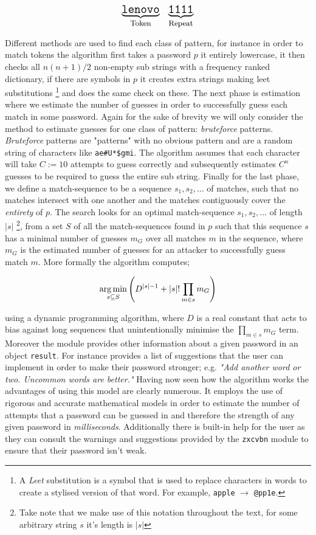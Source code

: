 \[
  \Large
  \underbrace{ \mathtt{lenovo} }_\text{\small Token}
  \; \; \;
  \underbrace{ \mathtt{1111} }_\text{\small Repeat}
\]

Different methods are used to find each class of pattern, for
instance in order to match tokens the algorithm first takes
a password $p$ it entirely lowercase, it then checks all
$n(n+1)/2$ non-empty sub strings with a frequency ranked
dictionary, if there are symbols in $p$ it creates extra
strings making leet substitutions \footnote{A \textit{Leet}
substitution is a symbol that is used to replace characters in words
to create a stylised version of that word. For example,
\texttt{apple} $\rightarrow$ \texttt{@pp1e}.}
and does the same check on these. The next phase is
estimation where we estimate the number of guesses in order
to successfully guess each match in some password. Again
for the sake of brevity we will only consider the method to
estimate guesses for one class of pattern: \textit{bruteforce}
patterns. \textit{Bruteforce} patterns are "patterns" with no
obvious pattern and are a random string of characters like
\texttt{ae\#U*\$gmi}. The algorithm assumes that each
character will take $C := 10$ attempts to guess correctly and
subsequently estimates $C^n$ guesses to be required to guess
the entire sub string. Finally for the last phase, we define a
match-sequence to be a sequence $s_1, s_2, ...$ of matches,
such that no matches intersect with one another and the
matches contiguously cover the \textit{entirety} of $p$.
The search looks
for an optimal match-sequence $s_1, s_2, ...$ of length
$\left|s\right|$ \footnote{Take note that we make use of
this notation throughout the text, for some arbitrary string $s$
it's length is $\left|s\right|$}, from a set $S$ of all the match-sequences
found in $p$ such that this sequence $s$ has a minimal number
of guesses $m_G$ over all matches $m$ in the sequence, where
$m_G$ is the estimated number of guesses for an attacker to
successfully guess match $m$. More formally the algorithm
computes;

\[
  \operatorname*{arg\,min}_{s \subseteq S} \left( D^{\left|s\right| -1} +
  \left|s\right|! \prod_{m \in s} m_G \right)
\]

using a dynamic programming algorithm,
where $D$ is a real constant that acts to bias against long
sequences that unintentionally minimise the
$\prod_{m \in s} m_G$ term. Moreover the module provides other
information about a given password in an object
\texttt{result}. For instance
 provides a list of
suggestions that the user can implement in order to make their
password stronger; e.g. \textit{"Add another word or two.
Uncommon words are better."} Having now seen how the
algorithm works the advantages of using this model are clearly
numerous. It employs the use of
rigorous and accurate mathematical models in order to estimate
the number of attempts that a password can be guessed in and
therefore the strength of any given password in
\emph{milliseconds}. Additionally there is built-in help for
the user as they can consult the warnings and suggestions
provided by the \texttt{zxcvbn} module to ensure that their
password isn't weak. \\ \vspace{0.2cm}


